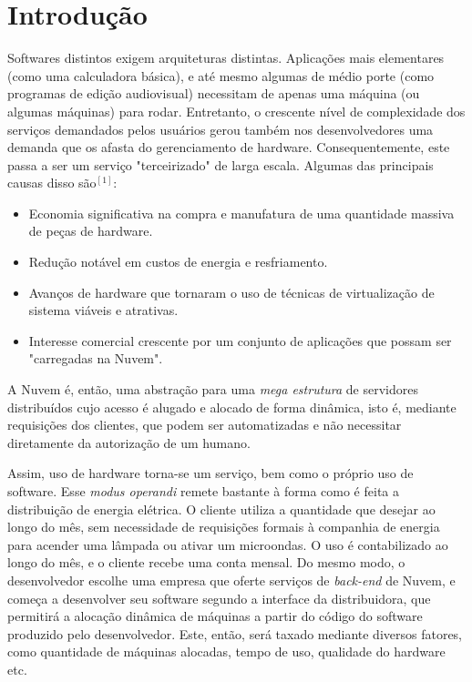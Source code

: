 \documentclass{llncs}
\begin{document}
\section{Introdução}
Softwares distintos exigem arquiteturas distintas. Aplicações mais elementares (como uma calculadora básica), e até mesmo algumas de médio porte (como programas de edição audiovisual) necessitam de apenas uma máquina (ou algumas máquinas) para rodar. Entretanto, o crescente nível de complexidade dos serviços demandados pelos usuários gerou também nos desenvolvedores uma demanda que os afasta do gerenciamento de hardware. Consequentemente, este passa a ser um serviço "terceirizado" de larga escala. Algumas das principais causas disso são$^{[1]}$:
\begin{itemize}
\item Economia significativa na compra e manufatura de uma quantidade massiva de peças de hardware.
\item Redução notável em custos de energia e resfriamento.
\item Avanços de hardware que tornaram o uso de técnicas de virtualização de sistema viáveis e atrativas.
\item Interesse comercial crescente por um conjunto de aplicações que possam ser "carregadas na Nuvem".
\end{itemize}

A Nuvem é, então, uma abstração para uma \emph{mega estrutura} de servidores distribuídos cujo acesso é alugado e alocado de forma dinâmica, isto é, mediante requisições dos clientes, que podem ser automatizadas e não necessitar diretamente da autorização de um humano.

Assim, uso de hardware torna-se um serviço, bem como o próprio uso de software. Esse \emph{modus operandi} remete bastante à forma como é feita a distribuição de energia elétrica. O cliente utiliza a quantidade que desejar ao longo do mês, sem necessidade de requisições formais à companhia de energia para acender uma lâmpada ou ativar um microondas. O uso é contabilizado ao longo do mês, e o cliente recebe uma conta mensal. Do mesmo modo, o desenvolvedor escolhe uma empresa que oferte serviços de \emph{back-end} de Nuvem, e começa a desenvolver seu software segundo a interface da distribuidora, que permitirá a alocação dinâmica de máquinas a partir do código do software produzido pelo desenvolvedor. Este, então, será taxado mediante diversos fatores, como quantidade de máquinas alocadas, tempo de uso, qualidade do hardware etc.
\end{document}
